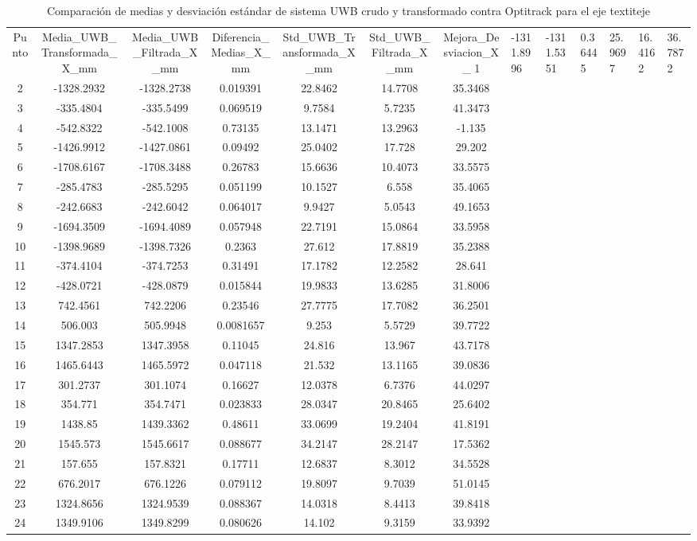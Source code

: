 \begin{table}[H]
\centering
\begin{tabular}{c c c c c c c }
\hline
Punto & Media\_UWB\_Transformada\_X\_mm & Media\_UWB\_Filtrada\_X\_mm & Diferencia\_Medias\_X\_mm & Std\_UWB\_Transformada\_X\_mm & Std\_UWB\_Filtrada\_X\_mm & Mejora\_Desviacion\_X\_%
1 & -1311.8996 & -1311.5351 & 0.36445 & 25.9697 & 16.4162 & 36.7872\\ 
2 & -1328.2932 & -1328.2738 & 0.019391 & 22.8462 & 14.7708 & 35.3468\\ 
3 & -335.4804 & -335.5499 & 0.069519 & 9.7584 & 5.7235 & 41.3473\\ 
4 & -542.8322 & -542.1008 & 0.73135 & 13.1471 & 13.2963 & -1.135\\ 
5 & -1426.9912 & -1427.0861 & 0.09492 & 25.0402 & 17.728 & 29.202\\ 
6 & -1708.6167 & -1708.3488 & 0.26783 & 15.6636 & 10.4073 & 33.5575\\ 
7 & -285.4783 & -285.5295 & 0.051199 & 10.1527 & 6.558 & 35.4065\\ 
8 & -242.6683 & -242.6042 & 0.064017 & 9.9427 & 5.0543 & 49.1653\\ 
9 & -1694.3509 & -1694.4089 & 0.057948 & 22.7191 & 15.0864 & 33.5958\\ 
10 & -1398.9689 & -1398.7326 & 0.2363 & 27.612 & 17.8819 & 35.2388\\ 
11 & -374.4104 & -374.7253 & 0.31491 & 17.1782 & 12.2582 & 28.641\\ 
12 & -428.0721 & -428.0879 & 0.015844 & 19.9833 & 13.6285 & 31.8006\\ 
13 & 742.4561 & 742.2206 & 0.23546 & 27.7775 & 17.7082 & 36.2501\\ 
14 & 506.003 & 505.9948 & 0.0081657 & 9.253 & 5.5729 & 39.7722\\ 
15 & 1347.2853 & 1347.3958 & 0.11045 & 24.816 & 13.967 & 43.7178\\ 
16 & 1465.6443 & 1465.5972 & 0.047118 & 21.532 & 13.1165 & 39.0836\\ 
17 & 301.2737 & 301.1074 & 0.16627 & 12.0378 & 6.7376 & 44.0297\\ 
18 & 354.771 & 354.7471 & 0.023833 & 28.0347 & 20.8465 & 25.6402\\ 
19 & 1438.85 & 1439.3362 & 0.48611 & 33.0699 & 19.2404 & 41.8191\\ 
20 & 1545.573 & 1545.6617 & 0.088677 & 34.2147 & 28.2147 & 17.5362\\ 
21 & 157.655 & 157.8321 & 0.17711 & 12.6837 & 8.3012 & 34.5528\\ 
22 & 676.2017 & 676.1226 & 0.079112 & 19.8097 & 9.7039 & 51.0145\\ 
23 & 1324.8656 & 1324.9539 & 0.088367 & 14.0318 & 8.4413 & 39.8418\\ 
24 & 1349.9106 & 1349.8299 & 0.080626 & 14.102 & 9.3159 & 33.9392\\ 
\hline
\end{tabular}
\caption{Comparación de medias y desviación estándar de sistema UWB crudo y transformado contra Optitrack para el eje textit{eje}}
\end{table}
